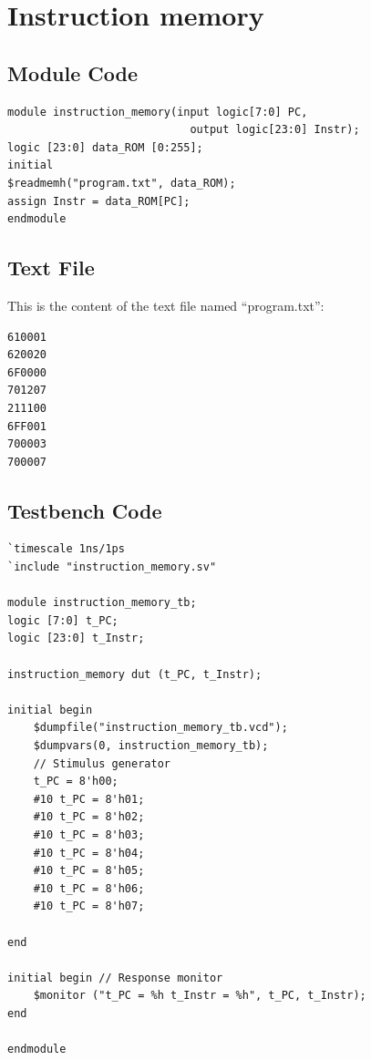 \documentclass{article}
\begin{document}
\newpage
\section{Instruction memory}

\subsection{Module Code}
\begin{lstlisting}
module instruction_memory(input logic[7:0] PC,
                            output logic[23:0] Instr);
logic [23:0] data_ROM [0:255];
initial
$readmemh("program.txt", data_ROM); 
assign Instr = data_ROM[PC]; 
endmodule
\end{lstlisting}

\subsection{Text File}
This is the content of the text file named ``program.txt'':
\begin{Verbatim}
610001
620020
6F0000
701207
211100
6FF001
700003
700007
\end{Verbatim}

\subsection{Testbench Code}
\begin{lstlisting}
`timescale 1ns/1ps 
`include "instruction_memory.sv"

module instruction_memory_tb;
logic [7:0] t_PC;
logic [23:0] t_Instr;

instruction_memory dut (t_PC, t_Instr);

initial begin
    $dumpfile("instruction_memory_tb.vcd"); 
    $dumpvars(0, instruction_memory_tb);
    // Stimulus generator
    t_PC = 8'h00; 
    #10 t_PC = 8'h01;
    #10 t_PC = 8'h02;
    #10 t_PC = 8'h03;
    #10 t_PC = 8'h04;
    #10 t_PC = 8'h05;
    #10 t_PC = 8'h06;
    #10 t_PC = 8'h07;
    
end

initial begin // Response monitor
    $monitor ("t_PC = %h t_Instr = %h", t_PC, t_Instr);
end

endmodule
\end{lstlisting}
\end{document}
